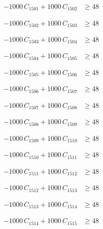\documentclass[a4paper,11pt]{article}
\begin{document}
\begin{align}
-1000\,C_{1501} + 1000\,C_{1502} &\geq 48 \nonumber
\end{align}

\begin{align}
-1000\,C_{1502} + 1000\,C_{1503} &\geq 48 \nonumber
\end{align}

\begin{align}
-1000\,C_{1503} + 1000\,C_{1504} &\geq 48 \nonumber
\end{align}

\begin{align}
-1000\,C_{1504} + 1000\,C_{1505} &\geq 48 \nonumber
\end{align}

\begin{align}
-1000\,C_{1505} + 1000\,C_{1506} &\geq 48 \nonumber
\end{align}

\begin{align}
-1000\,C_{1506} + 1000\,C_{1507} &\geq 48 \nonumber
\end{align}

\begin{align}
-1000\,C_{1507} + 1000\,C_{1508} &\geq 48 \nonumber
\end{align}

\begin{align}
-1000\,C_{1508} + 1000\,C_{1509} &\geq 48 \nonumber
\end{align}

\begin{align}
-1000\,C_{1509} + 1000\,C_{1510} &\geq 48 \nonumber
\end{align}

\begin{align}
-1000\,C_{1510} + 1000\,C_{1511} &\geq 48 \nonumber
\end{align}

\begin{align}
-1000\,C_{1511} + 1000\,C_{1512} &\geq 48 \nonumber
\end{align}

\begin{align}
-1000\,C_{1512} + 1000\,C_{1513} &\geq 48 \nonumber
\end{align}

\begin{align}
-1000\,C_{1513} + 1000\,C_{1514} &\geq 48 \nonumber
\end{align}

\begin{align}
-1000\,C_{1514} + 1000\,C_{1515} &\geq 48 \nonumber
\end{align}
\end{document}
